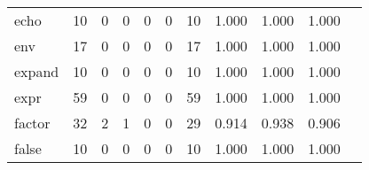 \begin{longtable}{lp{1.20cm}p{1.20cm}p{1.20cm}p{1.20cm}p{1.20cm}p{1.20cm}p{1.20cm}p{1.20cm}p{1.20cm}p{1.20cm}}
echo      &                                    10 &                                                  0 &                                                  0 &                                                  0 &                                                  0 &                                                 10 &                                         1.000 &                                              1.000 &                                              1.000 \\
env       &                                    17 &                                                  0 &                                                  0 &                                                  0 &                                                  0 &                                                 17 &                                         1.000 &                                              1.000 &                                              1.000 \\
expand    &                                    10 &                                                  0 &                                                  0 &                                                  0 &                                                  0 &                                                 10 &                                         1.000 &                                              1.000 &                                              1.000 \\
expr      &                                    59 &                                                  0 &                                                  0 &                                                  0 &                                                  0 &                                                 59 &                                         1.000 &                                              1.000 &                                              1.000 \\
factor    &                                    32 &                                                  2 &                                                  1 &                                                  0 &                                                  0 &                                                 29 &                                         0.914 &                                              0.938 &                                              0.906 \\
false     &                                    10 &                                                  0 &                                                  0 &                                                  0 &                                                  0 &                                                 10 &                                         1.000 &                                              1.000 &                                              1.000 \\

\end{longtable}
